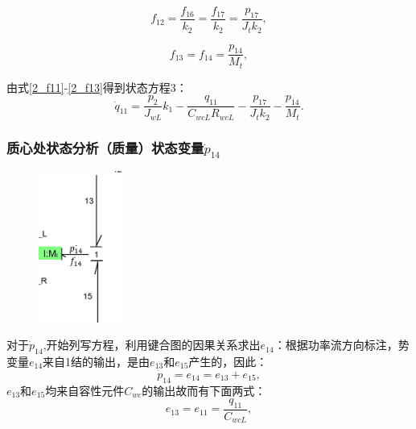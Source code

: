 \begin{equation}\label{2_f12}
f_{12}
=
\frac{f_{16}}{k_{2}} 
=
\frac{f_{17}}{k_{2}} 
=
\frac{p_{17}}{J_{t} k_{2}},
\end{equation}

\begin{equation}\label{2_f13}
f_{13}
=
f_{14}
=
\frac{p_{14}}{M_{t}},
\end{equation}

由式\ref{2_f11}-\ref{2_f13}得到状态方程3：
\begin{equation}\label{2_q11}
\dot{q}_{11}
=
\frac{p_{2}}{J_{w L}} k_{1}
-
\frac{q_{11}}{C_{wc L} R_{wc L}}
-
\frac{p_{17}}{J_{t} k_{2}}
-
\frac{p_{14}}{M_{t}}.
\end{equation}

\subsubsection{质心处状态分析（质量）状态变量$\dot{ p}_{14} $}
\begin{figure}[H]
	\centering
	\includegraphics[width=0.25\textwidth]{fig/2_equation4.png}
\end{figure}
对于$\dot{p} _ { 14 }$,开始列写方程，利用键合图的因果关系求出$e_{14}$：根据功率流方向标注，势变量$e_{14}$来自1结的输出，是由$e_{13}$和$e_{15}$产生的，因此：
\begin{equation}\label{2_e14}
\dot{p}_{14}
=
e_{14}
=
e_{13}
+
e_{15},
\end{equation}
$e_{13}$和$e_{15}$均来自容性元件$C _ { wc }$的输出故而有下面两式：
\begin{equation}\label{2_e13}
e_{13}
=
e_{11}
=
\frac{q_{11}}{C_{wc L}},
\end{equation}


